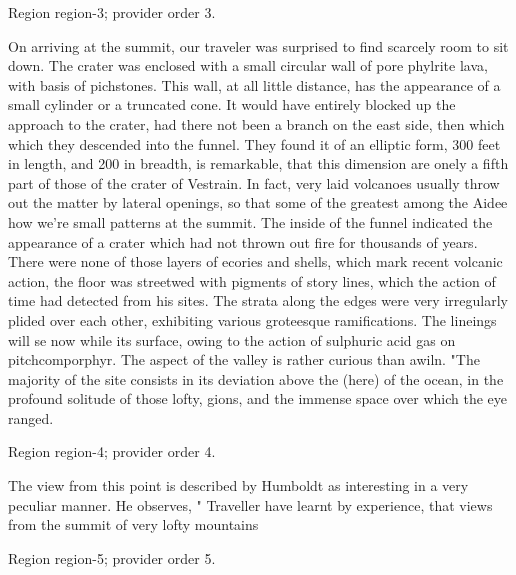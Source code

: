 \documentclass[11pt]{article}
\begin{document}
{\scriptsize\color{gray} Region region-3; provider order 3.\par}
\medskip

On arriving at the summit, our traveler was surprised to find scarcely room to sit down. The crater was enclosed with a small circular wall of pore phylrite lava, with basis of pichstones. This wall, at all little distance, has the appearance of a small cylinder or a truncated cone. It would have entirely blocked up the approach to the crater, had there not been a branch on the east side, then which which they descended into the funnel. They found it of an elliptic form, 300 feet in length, and 200 in breadth, is remarkable, that this dimension are onely a fifth part of those of the crater of Vestrain. In fact, very laid volcanoes usually throw out the matter by lateral openings, so that some of the greatest among the Aidee how we’re small patterns at the summit. The inside of the funnel indicated the appearance of a crater which had not thrown out fire for thousands of years. There were none of those layers of ecories and shells, which mark recent volcanic action, the floor was streetwed with pigments of story lines, which the action of time had detected from his sites. The strata along the edges were very irregularly plided over each other, exhibiting various groteesque ramifications. The lineings will se now while its surface, owing to the action of sulphuric acid gas on pitchcomporphyr. The aspect of the valley is rather curious than awiln. "The majority of the site consists in its deviation above the (here) of the ocean, in the profound solitude of those lofty, gions, and the immense space over which the eye ranged.
\par

{\scriptsize\color{gray} Region region-4; provider order 4.\par}
\medskip

The view from this point is described by Humboldt as interesting in a very peculiar manner. He observes, " Traveller have learnt by experience, that views from the summit of very lofty mountains
\par

{\scriptsize\color{gray} Region region-5; provider order 5.\par}
\medskip
\end{document}
